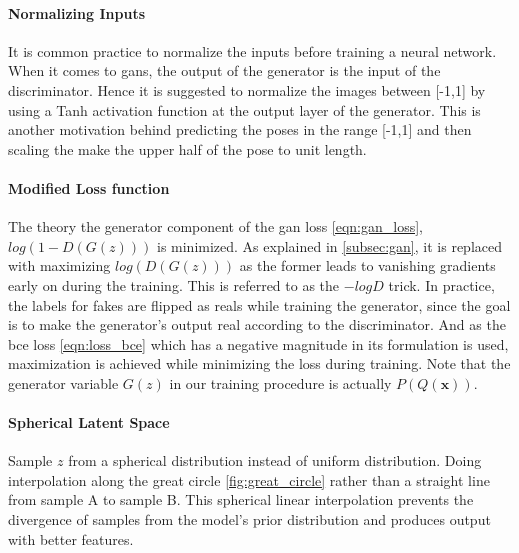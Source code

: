\paragraph{Normalizing Inputs} 
It is common practice to normalize the inputs before training a neural network. When it comes to \acp{gan}, the output of the generator is the input of the discriminator. Hence it is suggested to normalize the images between [-1,1] by using a Tanh activation function at the output layer of the generator. This is another motivation behind predicting the poses in the range [-1,1] and then scaling the make the upper half of the pose to unit length.

\paragraph{Modified Loss function}
The theory the generator component of the \ac{gan} loss \ref{eqn:gan_loss}, $log(1-D(G(z)))$ is minimized. As explained in \ref{subsec:gan}, it is replaced with maximizing $log(D(G(z)))$ as the former leads to vanishing gradients early on during the training. This is referred to as the $-logD$ trick. In practice, the labels for fakes are flipped as reals while training the generator, since the goal is to make the generator's output real according to the discriminator. And as the \ac{bce} loss \ref{eqn:loss_bce} which has a negative magnitude in its formulation is used, maximization is achieved while minimizing the loss during training. Note that the generator variable $G(z)$ in our training procedure is actually $P(Q(\textbf{x}))$. 

\paragraph{Spherical Latent Space}
Sample $z$ from a spherical distribution instead of uniform distribution. Doing interpolation along the great circle \ref{fig:great_circle} rather than a straight line from sample A to sample B. This spherical linear interpolation prevents the divergence of samples from the model's prior distribution and produces output with better features.

